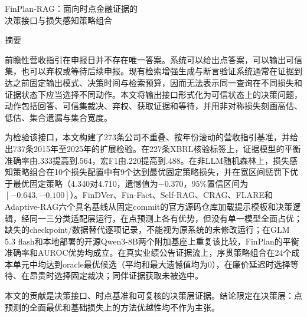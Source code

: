 \documentclass[12pt,openany]{ctexbook}
\newcommand{\method}{FinPlan-RAG}
\begin{document}
\clearpage
{}
{}
\begin{center}
{\heiti \method：面向时点金融证据的\\[0.2cm]
决策接口与损失感知策略组合\par}
\vspace{0.6cm}
{\heiti 摘\quad 要\par}
\end{center}
\vspace{0.4cm}
{\songti
前瞻性营收指引在申报日并不存在唯一答案。系统可以给出点答案，可以输出可信集，也可以弃权或等待后续申报。现有检索增强生成与断言验证系统通常在证据到达之前固定输出模式、决策时间与检索预算，因而无法表示同一查询在不同损失和证据状态下应当选择不同动作。本文将输出接口形式化为可信状态上的决策问题，动作包括回答、可信集裁决、弃权、获取证据和等待，并用非对称损失刻画高估、低估、集合遗漏与集合宽度。\par
为检验该接口，本文构建了273条公司不重叠、按年份滚动的营收指引基准，并给出737条2015年至2025年的扩展检验。在227条XBRL核验标签上，证据模型的平衡准确率由.333提高到.564，宏F1由.220提高到.488。在非LLM随机森林上，损失感知策略组合在10个损失配置中有9个达到最优固定策略损失，并在宽区间惩罚下优于最优固定策略（4.340对4.710，遗憾值为$-0.370$，95\%置信区间为$[-0.643,-0.100]$）。FinDVer、Fin-Fact、Self-RAG、CRAG、FLARE和Adaptive-RAG六个具名基线从固定commit的官方源码仓库加载提示模板和决策逻辑，经同一三分类适配层运行，在点预测上各有优势，但没有单一模型全面占优；缺失的checkpoint/数据替代逐项记录，不能视为原系统的未修改运行；在GLM 5.3 flash和本地部署的开源Qwen3-8B两个附加基座上重复该比较，FinPlan的平衡准确率和AUROC优势均成立。在真实业绩公告证据流上，序贯策略组合在24个成本单元中均达到oracle最优候选（平均和最大遗憾值均为0），在廉价延迟时选择等待、在昂贵时选择固定裁决；同伴证据获取未被选中。\par
本文的贡献是决策接口、时点基准和可复核的决策层证据。结论限定在决策层：点预测的全面最优和基础损失上的方法优越性均不作为主张。\par
}
\vspace{0.6cm}
\end{document}
